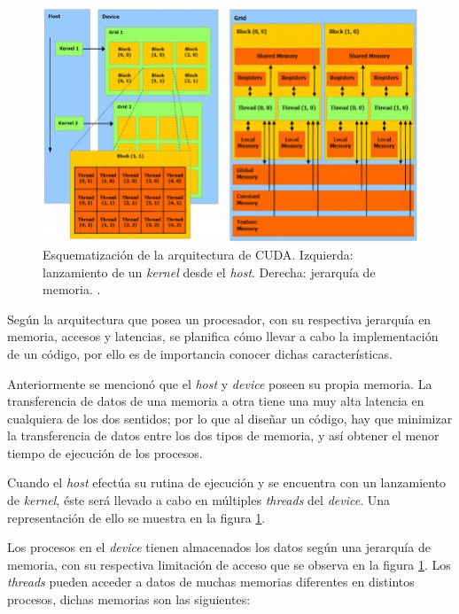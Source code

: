 \begin{figure}[h!]
	\centering
	\includegraphics[width=\textwidth]{figs/cap3/Schematization-of-CUDA-architecture-Schematic-representation-of-CUDA-threads-and-memory.png}
	\caption{Esquematización de la arquitectura de CUDA. Izquierda: lanzamiento de un \textit{kernel} desde el \textit{host}. Derecha: jerarquía de memoria.  \cite{nobile2014cutauleaping}.}
	\label{fig:schedule_architecture_cuda}
\end{figure}

Según la arquitectura que posea un procesador, con su respectiva jerarquía en memoria, accesos y latencias, se planifica cómo llevar a cabo la implementación de un código, por ello es de importancia conocer dichas características. 

Anteriormente se mencionó que el \textit{host} y \textit{device} poseen su propia memoria. La transferencia de datos de una memoria a otra tiene una muy alta latencia en cualquiera de los dos sentidos; por lo que al diseñar un código, hay que minimizar la transferencia de datos entre los dos tipos de memoria, y así obtener el menor tiempo de ejecución de los procesos.

Cuando el \textit{host} efectúa su rutina de ejecución y se encuentra con un lanzamiento de \textit{kernel}, éste será llevado a cabo en múltiples \textit{threads} del \textit{device}. Una representación de ello se muestra en la figura \ref{fig:schedule_architecture_cuda}. 

Los procesos en el \textit{device} tienen almacenados los datos según una jerarquía de memoria, con su respectiva limitación de acceso que se observa en la figura \ref{fig:schedule_architecture_cuda}. Los \textit{threads} pueden acceder a datos de muchas memorias diferentes en distintos procesos, dichas memorias son las siguientes:

